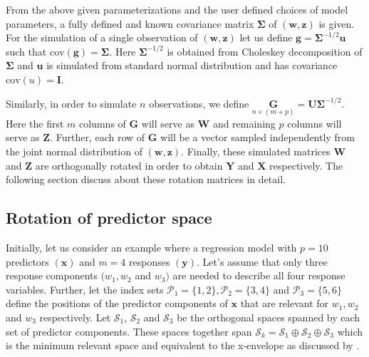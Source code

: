 \documentclass[3p,times,12pt,authoryear]{elsarticle}
\theoremstyle{definition}
\theoremstyle{definition}
\theoremstyle{remark}
\begin{document}
From the above given parameterizations and the user defined choices of
model parameters, a fully defined and known covariance matrix
\(\boldsymbol{\Sigma}\) of \((\mathbf{w, z})\) is given. For the
simulation of a single observation of \((\mathbf{w, z})\) let us define
\(\mathbf{g} = \boldsymbol{\Sigma}^{-1/2}\mathbf{u}\) such that
\(\text{cov}(\mathbf{g}) = \boldsymbol{\Sigma}\). Here
\(\boldsymbol{\Sigma}^{-1/2}\) is obtained from Choleskey decomposition
of \(\boldsymbol{\Sigma}\) and \(\mathbf{u}\) is simulated from standard
normal distribution and has covariance \(\text{cov}(u) = \mathbf{I}\).

Similarly, in order to simulate \(n\) observations, we define
\(\underset{n \times (m + p)}{\mathbf{G}} = \mathbf{U}\boldsymbol{\Sigma}^{-1/2}\).
Here the first \(m\) columns of \(\mathbf{G}\) will serve as
\(\mathbf{W}\) and remaining \(p\) columns will serve as \(\mathbf{Z}\).
Further, each row of \(\mathbf{G}\) will be a vector sampled
independently from the joint normal distribution of
\(\left(\mathbf{w}, \mathbf{z}\right)\). Finally, these simulated
matrices \(\mathbf{W}\) and \(\mathbf{Z}\) are orthogonally rotated in
order to obtain \(\mathbf{Y}\) and \(\mathbf{X}\) respectively. The
following section discuss about these rotation matrices in detail.

\subsection{Rotation of predictor
space}\label{rotation-of-predictor-space}

Initially, let us consider an example where a regression model with
\(p = 10\) predictors \((\mathbf{x})\) and \(m = 4\) responses
\((\mathbf{y})\). Let's assume that only three response components
\((w_1, w_2\) and \(w_3)\) are needed to describe all four response
variables. Further, let the index sets
\(\mathcal{P}_1 = \{1, 2\}, \mathcal{P}_2 = \{3, 4\}\) and
\(\mathcal{P}_3 = \{5, 6\}\) define the positions of the predictor
components of \(\mathbf{x}\) that are relevant for \(w_1, w_2\) and
\(w_3\) respectively. Let \(\mathcal{S}_1\), \(\mathcal{S}_2\) and
\(\mathcal{S}_3\) be the orthogonal spaces spanned by each set of
predictor components. These spaces together span
\(\mathcal{S}_k = \mathcal{S}_1 \oplus \mathcal{S}_2 \oplus \mathcal{S}_3\)
which is the minimum relevant space and equivalent to the x-envelope as
discussed by \citet{cook2013envelopes}.
\end{document}
